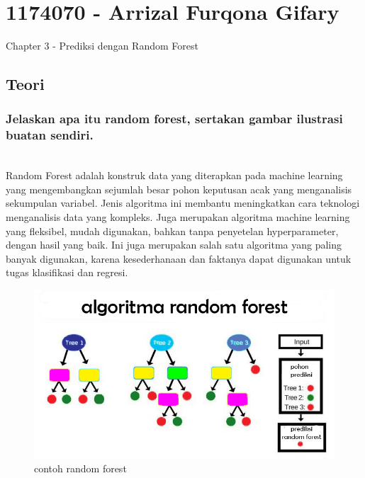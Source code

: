 \section{1174070 - Arrizal Furqona Gifary}
Chapter 3 - Prediksi dengan Random Forest
\subsection{Teori}
\subsubsection{ Jelaskan apa itu random forest, sertakan gambar ilustrasi buatan sendiri.}
\hfill\\
Random Forest adalah konstruk data yang diterapkan pada machine learning yang mengembangkan sejumlah besar pohon keputusan acak yang menganalisis sekumpulan variabel. Jenis algoritma ini membantu meningkatkan cara teknologi menganalisis data yang kompleks. Juga merupakan algoritma machine learning yang ﬂeksibel, mudah digunakan, bahkan tanpa penyetelan hyperparameter, dengan hasil yang baik. Ini juga merupakan salah satu algoritma yang paling banyak digunakan, karena kesederhanaan dan faktanya dapat digunakan untuk tugas klasiﬁkasi dan regresi.

\begin{figure}[H]
	\centering
	\includegraphics[width=12cm]{figures/1174070/figures3/1.png}
	\caption{contoh random forest}
\end{figure}


